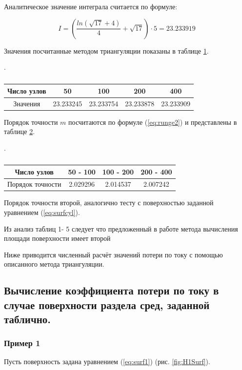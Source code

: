 \documentclass{article}
\begin{document}
Аналитическое значение интеграла считается по формуле:

\begin{equation}
I = (\frac{ln(\sqrt{17}+4)}{4}+\sqrt{17}) \cdot 5 = 23.233919
\end{equation}

Значения посчитанные методом триангуляции показаны в таблице \ref{table:square}.

\begin{table}
\centering
\caption{\label{table:square}}.
\newline
\begin{tabular}{|c|c|c|c|c|}
\hline
 Число узлов	& 50		& 100		& 200		& 400		\\ 
\hline
 Значения		& 23.233245	& 23.233754	& 23.233878	& 23.233909	\\  
\hline
\end{tabular}
\end{table}

Порядок точности $m$ посчитаются по формуле (\ref{eq:runge2}) и представлены в таблице \ref{tablee:porTochSquare}.

\begin{table}
\centering
\caption{\label{tablee:porTochSquare}}.
\begin{tabular}{|c|c|c|c|}
\hline
 Число узлов		& 50 - 100	& 100 - 200	& 200 - 400	\\ 
\hline
 Порядок точности	& 2.029296	& 2.014537	& 2.007242	\\  
\hline
\end{tabular}
\end{table}

Порядок точности второй, аналогично тесту с поверхностью заданной уравнением (\ref{eq:surfcyl}).

Из анализ таблиц 1- 5 следует что предложенный в работе метода вычисления площади поверхности имеет второй

Ниже приводится численный расчёт значений потери по току с помощью описанного метода триангуляции.

\subsection{Вычисление коэффициента потери по току в случае поверхности раздела сред, заданной таблично.}

\subsubsection*{Пример 1}\label{ex1tr}
Пусть поверхность задана уравнением (\ref{eq:surf1}) (рис. \ref{fig:H1Surf}).
\end{document}
